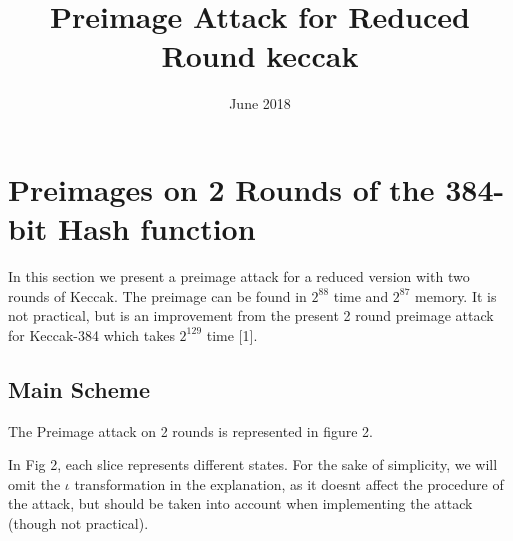 \documentclass{article}
\title{Preimage Attack for Reduced Round keccak}
\date{June 2018}
\begin{document}
\maketitle

\section{Preimages on 2 Rounds of the 384-bit Hash function}

\begin{center}
\end{center}

In this section we present a preimage attack for a reduced version with two rounds of Keccak. The preimage can be found in $2^{88}$ time and $2^{87}$ memory. It is not practical, but is an improvement from the present 2 round preimage attack for Keccak-384 which takes $2^{129}$ time [1].

\subsection{Main Scheme}
The Preimage attack on 2 rounds is represented in figure 2.\newline

In Fig 2, each slice represents different states. For the sake of simplicity, we will omit the $\iota$ transformation in the explanation, as it doesnt affect the procedure of the attack, but should be taken into account when implementing the attack (though not practical).
\end{document}
